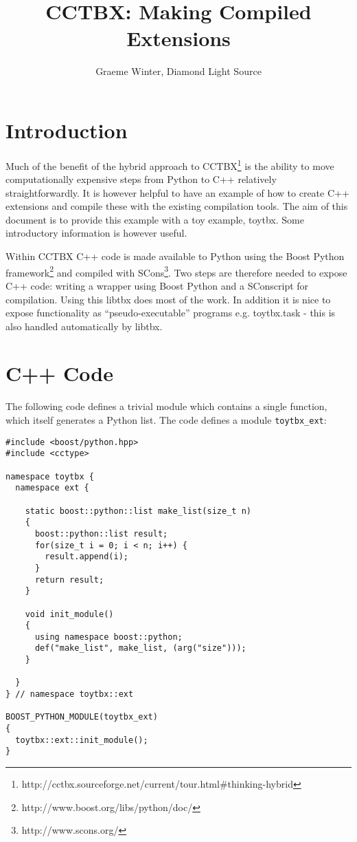 \documentclass[a4paper, 11pt]{article}
\title{CCTBX: Making Compiled Extensions}
\author{Graeme Winter, Diamond Light Source}
\begin{document}
\maketitle

\section{Introduction}

Much of the benefit of the hybrid approach to CCTBX\footnote{http://cctbx.sourceforge.net/current/tour.html\#thinking-hybrid} is the ability to move computationally expensive steps from Python to C++ relatively straightforwardly. It is however helpful to have an example of how to create C++ extensions and compile these with the existing compilation tools. The aim of this document is to provide this example with a toy example, toytbx. Some introductory information is however useful.

Within CCTBX C++ code is made available to Python using the Boost Python framework\footnote{http://www.boost.org/libs/python/doc/} and compiled with SCons\footnote{http://www.scons.org/}. Two steps are therefore needed to expose C++ code: writing a wrapper using Boost Python and a SConscript for compilation. Using this libtbx does most of the work. In addition it is nice to expose functionality as ``pseudo-executable'' programs e.g. toytbx.task - this is also handled automatically by libtbx.

\section{C++ Code}

The following code defines a trivial module which contains a single function, which itself generates a Python list. The code defines a module \verb|toytbx_ext|:

{\small
\begin{verbatim}
#include <boost/python.hpp>
#include <cctype>

namespace toytbx { 
  namespace ext {

    static boost::python::list make_list(size_t n)
    {
      boost::python::list result;
      for(size_t i = 0; i < n; i++) {
        result.append(i);
      }
      return result;
    }

    void init_module()
    {
      using namespace boost::python;
      def("make_list", make_list, (arg("size")));
    }

  }
} // namespace toytbx::ext

BOOST_PYTHON_MODULE(toytbx_ext)
{
  toytbx::ext::init_module();
}
\end{verbatim}
}
\end{document}
